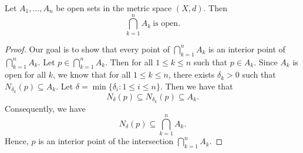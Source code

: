 \documentclass[a4paper]{report}
\begin{document}
\begin{theorem}[ ]
    Let \( {A}_{1}, \dots, {A}_{n} \) be open sets in the metric space \( (X,d) \). Then
    \[  \bigcap_{ k = 1  }^{ n }  {A}_{k} \ \text{is open}. \]
\end{theorem}
\begin{proof}
Our goal is to show that every point of \( \bigcap_{ k = 1  }^{ n  }  {A}_{k } \) is an interior point of \( \bigcap_{ k = 1  }^{ n }  {A}_{k } \). Let \( p \in \bigcap_{  k = 1  }^{ n }  {A}_{k } \). Then for all \(  1 \leq k \leq n  \) such that \( p \in {A}_{k} \). Since \( {A}_{k} \) is open for all \( k  \), we know that for all \( 1 \leq k \leq n   \), there exists \( {\delta}_{k} > 0  \) such that \( {N}_{{\delta}_{k }} (p) \subseteq {A}_{k} \). Let \( \delta = \min \{ {\delta}_{i} : 1 \leq i \leq n   \}  \). Then we have that  
\[  {N}_{\delta}(p) \subseteq  {N}_{{\delta}_{k }}(p) \subseteq  {A}_{k}. \]
Consequently, we have 
\[  {N}_{\delta}(p) \subseteq  \bigcap_{  k = 1 }^{ n }  {A}_{k}. \]
Hence, \( p  \) is an interior point of the intersection \( \bigcap_{  k = 1  }^{ n }  {A}_{k} \).
\end{proof}
\end{document}
